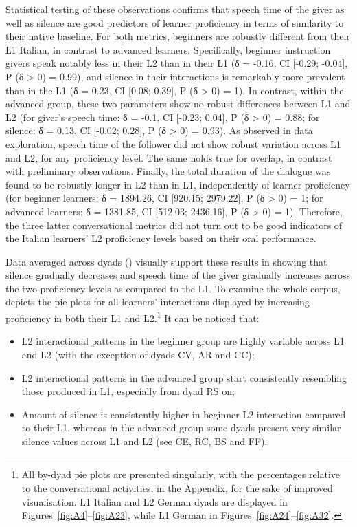 Statistical testing of these observations confirms that speech time of the giver as well as silence are good predictors of learner proficiency in terms of similarity to their native baseline. For both metrics, beginners are robustly different from their L1 Italian, in contrast to advanced learners. Specifically, beginner instruction givers speak notably less in their L2 than in their L1 (δ = -0.16, CI [-0.29; -0.04], P (δ > 0) = 0.99), and silence in their interactions is remarkably more prevalent than in the L1 (δ = 0.23, CI [0.08; 0.39], P (δ > 0) = 1). In contrast, within the advanced group, these two parameters show no robust differences between L1 and L2 (for giver’s speech time: δ = -0.1, CI [-0.23; 0.04], P (δ > 0) = 0.88; for silence: δ = 0.13, CI [-0.02; 0.28], P (δ > 0) = 0.93). As observed in data exploration, speech time of the follower did not show robust variation across L1 and L2, for any proficiency level. The same holds true for overlap, in contrast with preliminary observations. Finally, the total duration of the dialogue was found to be robustly longer in L2 than in L1, independently of learner proficiency (for beginner learners: δ = 1894.26, CI [920.15; 2979.22], P (δ > 0) = 1; for advanced learners: δ = 1381.85, CI [512.03; 2436.16], P (δ > 0) = 1). Therefore, the three latter conversational metrics did not turn out to be good indicators of the Italian learners’ L2 proficiency levels based on their oral performance.

Data averaged across dyads () visually support these results in showing that silence gradually decreases and speech time of the giver gradually increases across the two proficiency levels as compared to the L1. To examine the whole corpus,  depicts the pie plots for all learners’ interactions displayed by increasing proficiency in both their L1 and L2.\footnote{All by-dyad pie plots are presented singularly, with the percentages relative to the conversational activities, in the Appendix, for the sake of improved visualisation. L1 Italian and L2 German dyads are displayed in Figures~\ref{fig:A4}--\ref{fig:A23}, while L1 German in Figures~\ref{fig:A24}--\ref{fig:A32}.} It can be noticed that:

\begin{itemize}
\item L2 interactional patterns in the beginner group are highly variable across L1 and L2 (with the exception of dyads CV, AR and CC);
\item L2 interactional patterns in the advanced group start consistently resembling those produced in L1, especially from dyad RS on;
\item Amount of silence is consistently higher in beginner L2 interaction compared to their L1, whereas in the advanced group some dyads present very similar silence values across L1 and L2 (see CE, RC, BS and FF).
\end{itemize}

